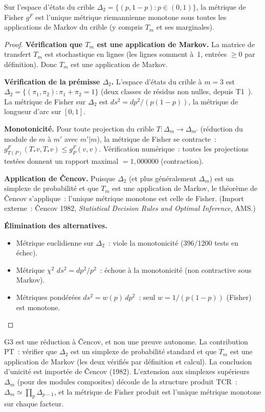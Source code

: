 \documentclass[12pt,a4paper]{article}
\begin{document}
\mTHM
\begin{theoreme}
\label{thm:G3}
Sur l'espace d'états du crible $\Delta_2 = \{(p, 1-p) : p \in (0,1)\}$,
la métrique de Fisher $g^F$ est l'unique métrique riemannienne
monotone sous toutes les applications de Markov du crible (y compris
$T_m$ et ses marginales).

\begin{proof}
\textbf{Vérification que $T_m$ est une application de Markov.}
La matrice de transfert $T_m$ est stochastique en lignes (les lignes
somment à~1, entrées $\geq 0$ par définition). Donc $T_m$ est une
application de Markov.

\textbf{Vérification de la prémisse $\Delta_2$.} L'espace d'états du
crible à $m = 3$ est
$\Delta_2 = \{(\pi_1, \pi_2) : \pi_1 + \pi_2 = 1\}$
(deux classes de résidus non nulles, depuis T1~\cite{companion_M1}).
La métrique de Fisher sur $\Delta_2$ est $ds^2 = dp^2/(p(1-p))$, la
métrique de longueur d'arc sur $[0,1]$.

\textbf{Monotonicité.} Pour toute projection du crible
$T : \Delta_m \to \Delta_{m'}$ (réduction du module de $m$ à $m'$
avec $m' | m$), la métrique de Fisher se contracte~:
$g^F_{T(P)}(T_*v, T_*v) \leq g^F_P(v,v)$.
Vérification numérique~: toutes les projections testées donnent un
rapport maximal $= 1{,}000000$ (contraction).

\textbf{Application de \v Cencov.} Puisque $\Delta_2$ (et plus
généralement $\Delta_m$) est un simplexe de probabilité et que $T_m$
est une application de Markov, le théorème de \v Cencov s'applique~:
l'unique métrique monotone est celle de Fisher.
(Import externe~: \v Cencov 1982, \emph{Statistical Decision Rules and
Optimal Inference}, AMS.)

\textbf{Élimination des alternatives.}
\begin{itemize}
\item Métrique euclidienne sur $\Delta_2$~: viole la monotonicité
  (396/1200 tests en échec).
\item Métrique $\chi^2$ $ds^2 = dp^2/p^2$~: échoue à la monotonicité
  (non contractive sous Markov).
\item Métriques pondérées $ds^2 = w(p)\,dp^2$~: seul
  $w = 1/(p(1-p))$ (Fisher) est monotone.
\end{itemize}
\end{proof}
\end{theoreme}

\begin{remarque}[Portée de G3]
G3 est une réduction à \v Cencov, et non une preuve autonome. La
contribution PT~: vérifier que $\Delta_2$ est un simplexe de
probabilité standard et que $T_m$ est une application de Markov (les
deux vérifiés par définition et calcul). La conclusion d'unicité est
importée de \v Cencov (1982). L'extension aux simplexes supérieurs
$\Delta_m$ (pour des modules composites) découle de la structure
produit TCR~: $\Delta_m \simeq \prod_p \Delta_{p-1}$, et la métrique
de Fisher produit est l'unique métrique monotone sur chaque facteur.
\end{remarque}
\end{document}
